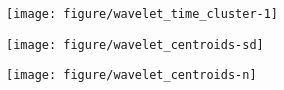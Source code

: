 \documentclass{article}
\begin{document}
\begin{figure}[ht]
  \centering
  \texttt{[image: figure/wavelet\_time\_cluster-1]}
  \caption{\label{fig:wavelet_time_cluster-1} }
\end{figure}

\begin{figure}[ht]
  \centering
  \texttt{[image: figure/wavelet\_centroids-sd]}
  \caption{\label{fig:wavelet_centroids-sd} }
\end{figure}

\begin{figure}[ht]
  \centering
  \texttt{[image: figure/wavelet\_centroids-n]}
  \caption{\label{fig:wavelet_centroids-n} }
\end{figure}



\end{document}
